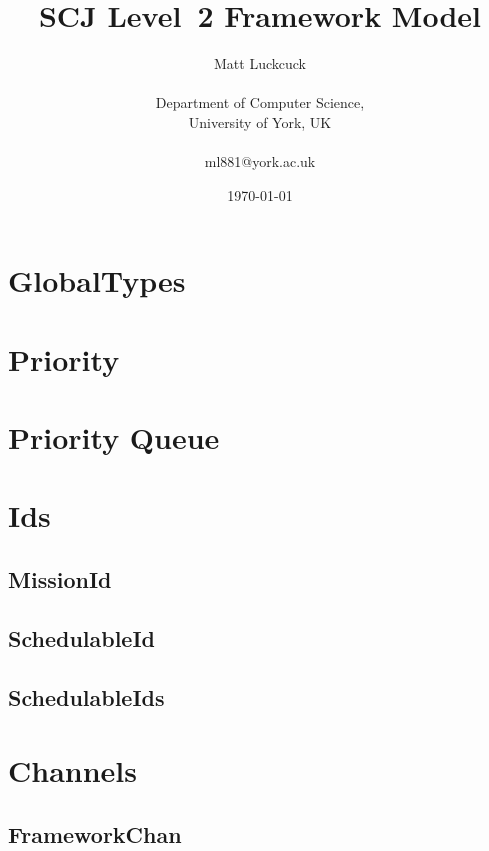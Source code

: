 \documentclass{article}
\title{SCJ Level~2 Framework Model}
\author{Matt Luckcuck \\\\Department of Computer Science, \\University of York, UK \\\\ml881@york.ac.uk}
\date{\today}
\begin{document}
\begin{report}
\maketitle

\tableofcontents

\newpage
\end{report}

\begin{plumbing}
\section{GlobalTypes}

\newpage

\section{Priority}

\newpage

\section{Priority Queue}

\newpage

\section{Ids}
\subsection{MissionId}


\subsection{SchedulableId}

\newpage
\subsection{SchedulableIds}

\newpage

\section{Channels}
\subsection{FrameworkChan}



\end{plumbing}
\end{document}
